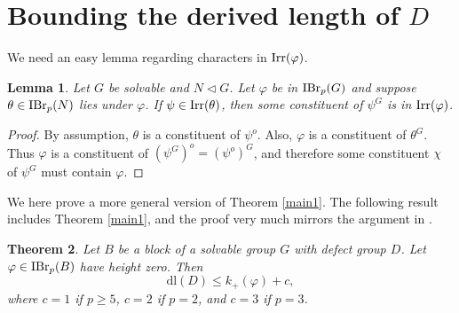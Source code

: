 \documentclass[11pt]{amsart}
\newtheorem{theorem}{Theorem}[section]
\newtheorem{lemma}[theorem]{Lemma}
\newcommand \irr {\textup{Irr}}
\newcommand \ibr {{\textup{IBr}}_p}
\newcommand{\dl}{\mathrm {dl}}
\newcommand \nrml {\lhd}
\begin{document}
\section{Bounding the derived length of $D$}

We need an easy lemma regarding characters in $\irr(\varphi)$.

\begin{lemma}\label{overlemma}  Let $G$ be solvable and $N \nrml G$.  Let $\varphi$ be in  $\ibr(G)$ and suppose $\theta \in \ibr(N)$ lies under $\varphi$.  If $\psi \in \irr(\theta)$, then some constituent of $\psi^G$ is in $\irr(\varphi)$.
\end{lemma}

\begin{proof}  By assumption, $\theta$ is a constituent of $\psi^o$.  Also, $\varphi$ is a constituent of $\theta^G$.  Thus $\varphi$ is a constituent of $(\psi^G)^o = (\psi^o)^G$, and therefore some constituent $\chi$ of $\psi^G$ must contain $\varphi$. 
\end{proof}

We here prove a more general version of Theorem \ref{main1}.   The following result includes Theorem \ref{main1}, and the proof very much mirrors the argument in \cite{4paper}.

\begin{theorem}\label{main2}  Let $B$ be a block of a solvable group $G$ with defect group $D$.  Let $\varphi \in \ibr(B)$ have height zero.  Then $$\dl(D) \leq k_+(\varphi) + c,$$ where $c = 1$ if $p \geq 5$, $c = 2$ if $p =2$, and $c = 3$ if $p = 3$.
\end{theorem}
\end{document}

